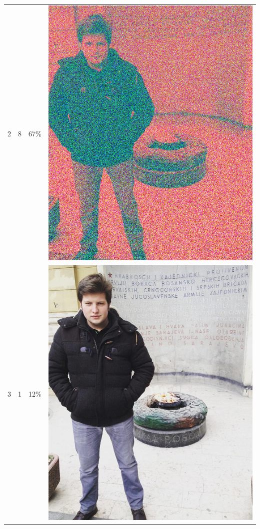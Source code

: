 \documentclass[times, utf8, seminar]{fer}
\begin{document}
\begin{center}
\begin{longtable}{|c|c|c|c|}
2 & 8 &67\% & \includegraphics[scale=0.3]{../benchmark_results/pattern/2_components-8_bits.png} \\
3 & 1 &12\% & \includegraphics[scale=0.3]{../benchmark_results/pattern/3_components-1_bits.png} \\

\end{longtable}
\end{center}
\end{document}

